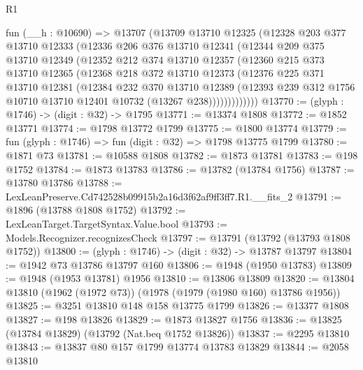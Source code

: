 \begin{lexlean}{R1}
\begin{coremodule}
      fun (__h : @10690) =>
      @13707
        (@13709
          @13710
          @12325
          (@12328
            @203
            @377
            @13710
            @12333
            (@12336
              @206
              @376
              @13710
              @12341
              (@12344
                @209
                @375
                @13710
                @12349
                (@12352
                  @212
                  @374
                  @13710
                  @12357
                  (@12360
                    @215
                    @373
                    @13710
                    @12365
                    (@12368
                      @218
                      @372
                      @13710
                      @12373
                      (@12376
                        @225
                        @371
                        @13710
                        @12381
                        (@12384
                          @232
                          @370
                          @13710
                          @12389
                          (@12393
                            @239
                            @312
                            @1756
                            @10710
                            @13710
                            @12401
                            @10732
                            (@13267 @238)))))))))))))
@13770 := (glyph : @1746) -> (digit : @32) -> @1795
@13771 := @13374 @1808
@13772 := @1852 @13771
@13774 := @1798 @13772 @1799
@13775 := @1800 @13774
@13779 := fun (glyph : @1746) => fun (digit : @32) => @1798 @13775 @1799
@13780 := @1871 @73
@13781 := @10588 @1808
@13782 := @1873 @13781
@13783 := @198 @1752
@13784 := @1873 @13783
@13786 := @13782 (@13784 @1756)
@13787 := @13780 @13786
@13788 := LexLeanPreserve.Cd742528b09915b2a16d3f62af9ff3ff7.R1.__fits_2
@13791 := @1896 (@13788 @1808 @1752)
@13792 := LexLeanTarget.TargetSyntax.Value.bool
@13793 := Models.Recognizer.recognizesCheck
@13797 := @13791 (@13792 (@13793 @1808 @1752))
@13800 := (glyph : @1746) -> (digit : @32) -> @13787 @13797
@13804 := @1942 @73 @13786 @13797 @160
@13806 := @1948 (@1950 @13783)
@13809 := @1948 (@1953 @13781) @1956
@13810 := @13806 @13809
@13820 := @13804 @13810 (@1962 (@1972 @73)) (@1978 (@1979 (@1980 @160) @13786 @1956))
@13825 := @3251 @13810 @148 @158 @13775 @1799
@13826 := @13377 @1808
@13827 := @198 @13826
@13829 := @1873 @13827 @1756
@13836 := @13825 (@13784 @13829) (@13792 (Nat.beq @1752 @13826))
@13837 := @2295 @13810
@13843 := @13837 @80 @157 @1799 @13774 @13783 @13829
@13844 := @2058 @13810

\end{coremodule}
\end{lexlean}
